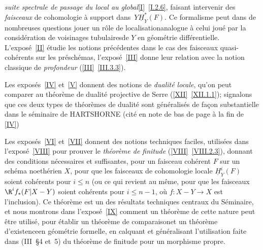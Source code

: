 \og \emph{suite spectrale de passage du local au global}\fg \ref{I}~\ref{I.2.6}, faisant intervenir des \emph{faisceaux} de cohomologie \og \`a support dans~$Y$\fg $\underline{H}^*_Y(F)$. Ce formalisme peut dans de nombreuses questions jouer un r\^{o}le de \og localisation\fg analogue \`a celui jou\'e par la consid\'eration de voisinages \og tubulaires\fg de $Y$ en g\'eom\'etrie diff\'erentielle. L'expos\'e~\ref{II} \'etudie les notions pr\'ec\'edentes dans le cas des faisceaux quasi-coh\'erents sur les pr\'esch\'emas, l'expos\'e~\ref{III} donne leur relation avec la notion classique de \emph{profondeur} (\ref{III}~\ref{III.3.3}).

Les expos\'es~\ref{IV} et~\ref{V} donnent des notions de \emph{dualité locale}, qu'on peut comparer au th\'eor\`eme de dualit\'e projective de Serre (\ref{XII}~\ref{XII.1.1}); signalons que ces deux types de th\'eor\`emes de dualit\'e sont g\'en\'eralis\'es de fa\c con substantielle dans le s\'eminaire de HARTSHORNE (cit\'e en note de bas de page \`a la fin de \Exp \ref{IV})

Les expos\'es~\ref{VI} et~\ref{VII} donnent des notions techniques faciles, utilis\'ees dans l'expos\'e~\ref{VIII} pour prouver le \emph{théorème de finitude} (\ref{VIII}~\ref{VIII.2.3}), donnant des conditions n\'ecessaires et suffisantes, pour un faisceau coh\'erent $F$ sur un sch\'ema noeth\'erien $X$, pour que les faisceaux de cohomologie locale $\underline{H}^i_Y(F)$ soient coh\'erents pour $i\leq n$ (ou ce qui revient au m\^eme, pour que les faisceaux $\R^if_*(F|X-Y)$ soient coh\'erents pour $i\leq n-1$, o\`u $f\colon X-Y\to X$ est l'inclusion). Ce th\'eor\`eme est un des r\'esultats techniques centraux du S\'eminaire, et nous montrons dans l'expos\'e~\ref{IX} comment un th\'eor\`eme de cette nature peut \^etre utilis\'e, pour \'etablir un \og th\'eor\`eme de comparaison\fg et un \og th\'eor\`eme d'existence\fg en g\'eom\'etrie formelle, en calquant et g\'en\'eralisant l'utilisation faite dans (\EGA III~\oldS\S 4 et~5) du th\'eor\`eme de finitude pour un morphisme propre.

